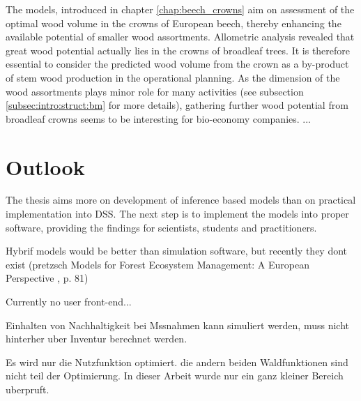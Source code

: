 The models, introduced in chapter \ref{chap:beech_crowns} aim on assessment of the optimal wood volume in the crowns of European beech, thereby enhancing the available potential of smaller wood assortments. Allometric analysis revealed that great wood potential actually lies in the crowns of broadleaf trees. It is therefore essential to consider the predicted wood volume from the crown as a by-product of stem wood production in the operational planning. As the dimension of the wood assortments plays minor role for many activities (see subsection \ref{subsec:intro:struct:bm} for more details), gathering further wood potential from broadleaf crowns seems to be interesting for bio-economy companies.
...

\section{Outlook}
\label{sec:discussion:outlook}
The thesis aims more on development of inference based models than on practical implementation into DSS. The next step is to implement the models into proper software, providing the findings for scientists, students and practitioners.

Hybrif models would be better than simulation software, but recently they dont exist (pretzsch Models for Forest Ecosystem Management: A European Perspective
, p. 81)

Currently no user front-end...

Einhalten von Nachhaltigkeit bei Mssnahmen kann simuliert werden, muss nicht hinterher uber Inventur berechnet werden.

Es wird nur die Nutzfunktion optimiert. die andern beiden Waldfunktionen sind nicht teil der Optimierung.
In dieser Arbeit wurde nur ein ganz kleiner Bereich uberpruft.
